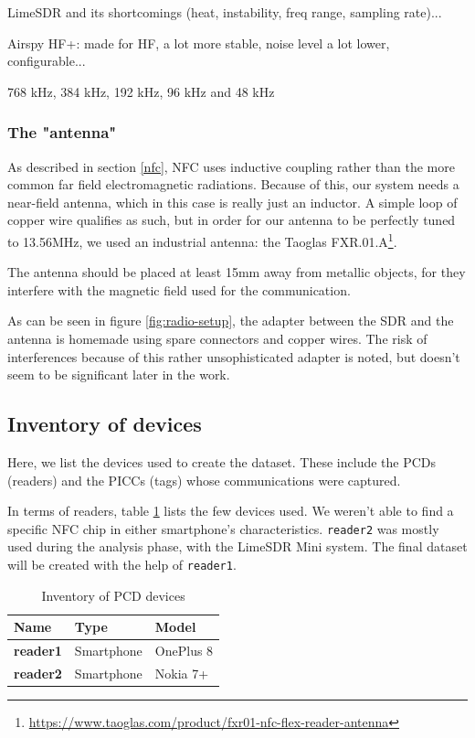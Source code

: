 LimeSDR and its shortcomings (heat, instability, freq range, sampling rate)...

Airspy HF+: made for HF, a lot more stable, noise level a lot lower, configurable...

768 kHz, 384 kHz, 192 kHz, 96 kHz and 48 kHz

\subsubsection{The "antenna"}

As described in section \ref{nfc}, NFC uses inductive coupling rather than the more common far field electromagnetic radiations. Because of this, our system needs a near-field antenna, which in this case is really just an inductor. A simple loop of copper wire qualifies as such, but in order for our antenna to be perfectly tuned to 13.56MHz, we used an industrial antenna: the Taoglas FXR.01.A\footnote{\url{https://www.taoglas.com/product/fxr01-nfc-flex-reader-antenna}}.

The antenna should be placed at least 15mm away from metallic objects, for they interfere with the magnetic field used for the communication.

As can be seen in figure \ref{fig:radio-setup}, the adapter between the SDR and the antenna is homemade using spare connectors and copper wires. The risk of interferences because of this rather unsophisticated adapter is noted, but doesn't seem to be significant later in the work.

\subsection{Inventory of devices}

Here, we list the devices used to create the dataset. These include the PCDs (readers) and the PICCs (tags) whose communications were captured.

In terms of readers, table \ref{tab:pcd-inventory} lists the few devices used. We weren't able to find a specific NFC chip in either smartphone's characteristics. \texttt{reader2} was mostly used during the analysis phase, with the LimeSDR Mini system. The final dataset will be created with the help of \texttt{reader1}.

\begin{table}[h!]
  \centering
  \begin{tabular}{|l|l|l|}
    \hline
    \textbf{Name}    & \textbf{Type} & \textbf{Model} \\ \hline
    \textbf{reader1} & Smartphone    & OnePlus 8      \\ \hline
    \textbf{reader2} & Smartphone    & Nokia 7+       \\ \hline
  \end{tabular}
  \caption{Inventory of PCD devices}
  \label{tab:pcd-inventory}
\end{table}

